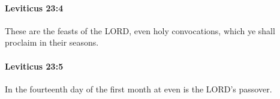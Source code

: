 		\paragraph{Leviticus 23:4} %
			\label{LEVITICUS-23-4}

			These are the feasts of the LORD, even holy convocations, which ye shall proclaim in their seasons.


		\paragraph{Leviticus 23:5} %
			\label{LEVITICUS-23-5}

			In the fourteenth day of the first month at even is the LORD’s passover.


